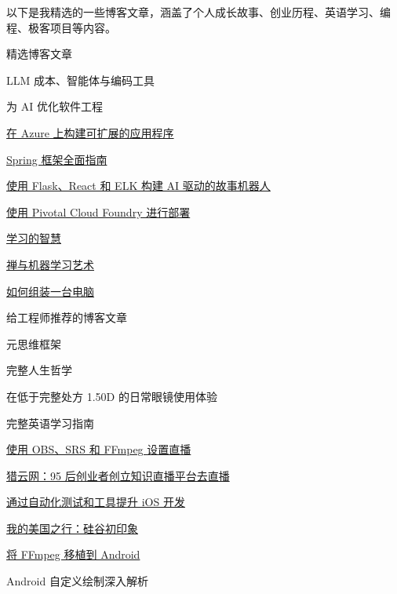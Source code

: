 

\begin{cvparagraph}
  以下是我精选的一些博客文章，涵盖了个人成长故事、创业历程、英语学习、编程、极客项目等内容。
\end{cvparagraph}

\begin{cventries}

  \cventry
    {精选博客文章} %
    {} %
    {} %
    {} %
    {
      \begin{cvitems}
        \item LLM 成本、智能体与编码工具
        \item 为 AI 优化软件工程
        \item \href{https://lzwjava.com/azure-en}{在 Azure 上构建可扩展的应用程序}
        \item \href{https://lzwjava.com/spring-en}{Spring 框架全面指南}
        \item \href{https://lzwjava.com/bot-en}{使用 Flask、React 和 ELK 构建 AI 驱动的故事机器人}
        \item \href{https://lzwjava.com/pcf-en}{使用 Pivotal Cloud Foundry 进行部署}
        \item \href{https://lzwjava.com/learning-wisdom}{学习的智慧}
        \item \href{https://lzwjava.com/zen-neural-en}{禅与机器学习艺术}
        \item \href{https://lzwjava.com/computer-en}{如何组装一台电脑}
        \item 给工程师推荐的博客文章
        \item 元思维框架
        \item 完整人生哲学
        \item 在低于完整处方 1.50D 的日常眼镜使用体验
        \item 完整英语学习指南
        \item \href{https://lzwjava.com/streaming-en}{使用 OBS、SRS 和 FFmpeg 设置直播}
        \item \href{https://lzwjava.com/lieyun-en}{猎云网：95 后创业者创立知识直播平台去直播}
        \item \href{https://lzwjava.com/ios-test-en}{通过自动化测试和工具提升 iOS 开发}
        \item \href{https://lzwjava.com/silicon-valley-trip}{我的美国之行：硅谷初印象}
        \item \href{https://lzwjava.com/ffmpeg-android-port}{将 FFmpeg 移植到 Android}
        \item Android 自定义绘制深入解析
      \end{cvitems}
    }

\end{cventries}
